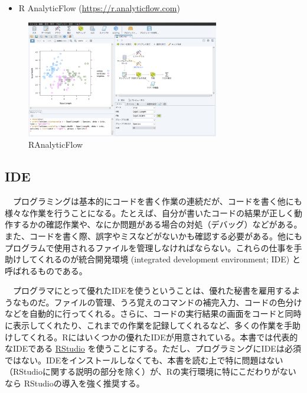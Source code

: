 \documentclass[
  a4paper,
  pandoc,
  ja=standard,
  jafont=haranoaji]{bxjsbook}
\providecommand{\tightlist}{%
  \setlength{\itemsep}{0pt}\setlength{\parskip}{0pt}}
\begin{document}
\begin{itemize}
\tightlist
\item
  R AnalyticFlow (\url{https://r.analyticflow.com})
\end{itemize}

\begin{figure}

{\centering \includegraphics[width=0.75\textwidth,height=\textheight]{./Figs/AboutR/GUI_RAnalyticFlow.png}

}

\caption{\label{fig-aboutr_ranalyticflow}RAnalyticFlow}

\end{figure}

\hypertarget{aboutR-IDE}{%
\subsection{IDE}\label{aboutR-IDE}}

　プログラミングは基本的にコードを書く作業の連続だが、コードを書く他にも様々な作業を行うことになる。たとえば、自分が書いたコードの結果が正しく動作するかの確認作業や、なにか問題がある場合の対処（デバッグ）などがある。また、コードを書く際、誤字やミスなどがないかも確認する必要がある。他にもプログラムで使用されるファイルを管理しなければならない。これらの仕事を手助けしてくれるのが統合開発環境
(integrated development environment; IDE) と呼ばれるものである。

　プログラマにとって優れたIDEを使うということは、優れた秘書を雇用するようなものだ。ファイルの管理、うろ覚えのコマンドの補完入力、コードの色分けなどを自動的に行ってくれる。さらに、コードの実行結果の画面をコードと同時に表示してくれたり、これまでの作業を記録してくれるなど、多くの作業を手助けしてくれる。Rにはいくつかの優れたIDEが用意されている。本書では代表的なIDEである
\href{https://rstudio.com}{RStudio}
を使うことにする。ただし、プログラミングにIDEは必須ではない。IDEをインストールしなくても、本書を読む上で特に問題はない（RStudioに関する説明の部分を除く）が、Rの実行環境に特にこだわりがないなら
RStudioの導入を強く推奨する。
\end{document}

